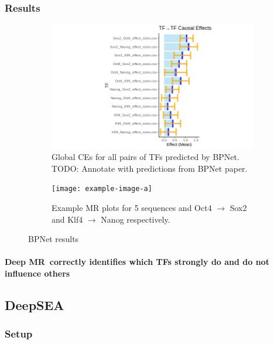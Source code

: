 \documentclass[twoside,11pt]{article}
\newcommand{\method}{{Deep MR}}
\begin{document}
\subsubsection{Results}%
\label{ssub:bpnet_results}
\begin{figure}[htpb]
	\begin{subfigure}[t]{.5\textwidth}
		\centering		
		\includegraphics[width=\linewidth]{fig/bpnet_tf_to_tf_global_ces}
		\caption{Global CEs for all pairs of TFs predicted by BPNet. TODO: Annotate with predictions from BPNet paper.}%
		\label{fig:bpnet_tf_to_tf_global_ces}
	\end{subfigure}
	\begin{subfigure}[t]{.5\textwidth}
		\centering
		\texttt{[image: example-image-a]}
		\caption{Example MR plots for 5 sequences and Oct4 \( \rightarrow \) Sox2 and Klf4 \( \rightarrow \) Nanog respectively.}
		\label{fig:bpnet_eff_size_pair_exs}
	\end{subfigure}

	\caption{BPNet results}
\end{figure}

\paragraph{\method\ correctly identifies which TFs strongly do and do not influence others}%
\label{par:bpnet_res_1}

\subsection{DeepSEA}%
\label{sub:deepsea}
\subsubsection{Setup}%
\label{ssub:deepsea_setup}
\end{document}
